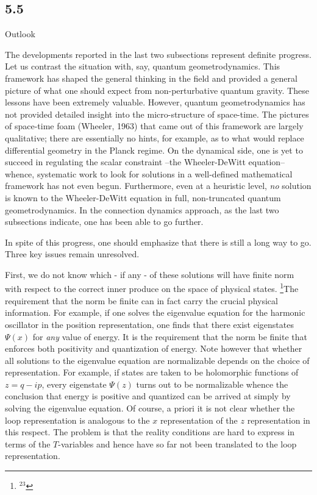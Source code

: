 \goodbreak
\subsection{5.5}{Outlook}

The developments reported in the last two subsections represent definite
progress. Let us contrast the situation with, say, quantum geometrodynamics.
This framework has shaped the general thinking in the field and provided a
general picture of what one should expect from non-perturbative quantum
gravity. These lessons have been extremely valuable. However, quantum
geometrodynamics has not provided detailed insight into the micro-structure
of space-time. The pictures of space-time foam (Wheeler, 1963) that came out
of this framework are largely qualitative; there are essentially no hints,
for example, as to what would replace differential geometry in the Planck
regime. On the dynamical side, one is yet to succeed in regulating the
scalar constraint --the Wheeler-DeWitt equation-- whence, systematic work to
look for solutions in a well-defined mathematical framework has not even begun.
Furthermore, even at a heuristic level, {\it no} solution is known to the
Wheeler-DeWitt equation in full, non-truncated quantum geometrodynamics. In
the connection dynamics approach, as the last two subsections indicate, one
has been able to go further.

In spite of this progress, one should emphasize that there is still a long
way to go. Three key issues remain unresolved.

First, we do not know which - if any - of these solutions will have finite
norm with respect to the correct inner produce on the space of physical states.%
\footnote{$^{23}$}{The requirement that the norm be finite can in fact carry the
crucial physical information. For example, if one solves the eigenvalue
equation for the harmonic oscillator in the position representation, one finds
that there exist eigenstates $\Psi(x)$ for {\it any} value of energy. It is
the requirement that the norm be finite that enforces both positivity and
quantization of energy. Note however that whether all solutions to the
eigenvalue equation are normalizable depends on the choice of representation.
For example, if states are taken to be holomorphic functions of $z=q-ip$,
every eigenstate $\Psi(z)$ turns out to be normalizable whence the conclusion
that energy is positive and quantized can be arrived at simply by solving the
eigenvalue equation. Of course, a priori it is not clear whether the loop
representation is analogous to the $x$ representation of the $z$ representation
in this respect.}
The problem is that the reality conditions are hard to express in terms of
the $T$-variables and hence have so far not been translated to the loop
representation.

